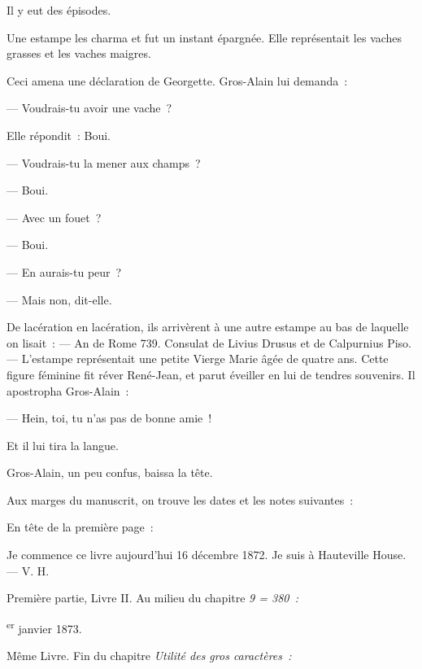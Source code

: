 \documentclass[french,twoside]{book} %
\def\mednobreak{\ifdim\lastskip<\medskipamount
  \removelastskip\nopagebreak\medskip\fi}
\newcommand{\labelblock}[1]{\medbreak{\noindent\color{rubric}\bfseries #1}\par\mednobreak}
\newenvironment{quoteblock}%
  {\begin{quoting}}
  {\end{quoting}}
\newenvironment{quotebar}{%
    \def\FrameCommand{{\color{rubric!10!}\vrule width 0.5em} \hspace{0.9em}}%
    \def\OuterFrameSep{\itemsep} %
    \MakeFramed {\advance\hsize-\width \FrameRestore}
  }%
  {%
    \endMakeFramed
  }
\renewenvironment{quoteblock}%
  {%
    \savenotes
    \setstretch{0.9}
    \normalfont
    \begin{quotebar}
  }
  {%
    \end{quotebar}
    \spewnotes
  }
\begin{document}
\begin{quoteblock}
 \noindent Il y eut des épisodes.\par
 Une estampe les charma et fut un instant épargnée. Elle représentait les vaches grasses et les vaches maigres.\par
   Ceci amena une déclaration de Georgette. Gros-Alain lui demanda :\par
 — Voudrais-tu avoir une vache ?\par
 Elle répondit : Boui.\par
 — Voudrais-tu la mener aux champs ?\par
 — Boui.\par
 — Avec un fouet ?\par
 — Boui.\par
 — En aurais-tu peur ?\par
 — Mais non, dit-elle.\par
 De lacération en lacération, ils arrivèrent à une autre estampe au bas de laquelle on lisait : — An de Rome 739. Consulat de Livius Drusus et de Calpurnius Piso. — L’estampe représentait une petite Vierge Marie âgée de quatre ans. Cette figure féminine fit réver René-Jean, et parut éveiller en lui de tendres souvenirs. Il apostropha Gros-Alain :\par
 — Hein, toi, tu n’as pas de bonne amie !\par
 Et il lui tira la langue.\par
 Gros-Alain, un peu confus, baissa la tête.
 \end{quoteblock}


\labelblock{Note III}

\noindent Aux marges du manuscrit, on trouve les dates et les notes suivantes :\par
\bigbreak
\noindent En tête de la première page :\par

\begin{quoteblock}
 \noindent Je commence ce livre aujourd’hui 16 décembre 1872. Je suis à Hauteville House. — V. H.
 \end{quoteblock}

\noindent Première partie, Livre II. Au milieu du chapitre \emph{9 = 380 :}\par

\begin{quoteblock}
 \textsuperscript{er} janvier 1873.
 \end{quoteblock}

 \noindent Même Livre. Fin du chapitre \emph{Utilité des gros caractères :}\par
\end{document}
